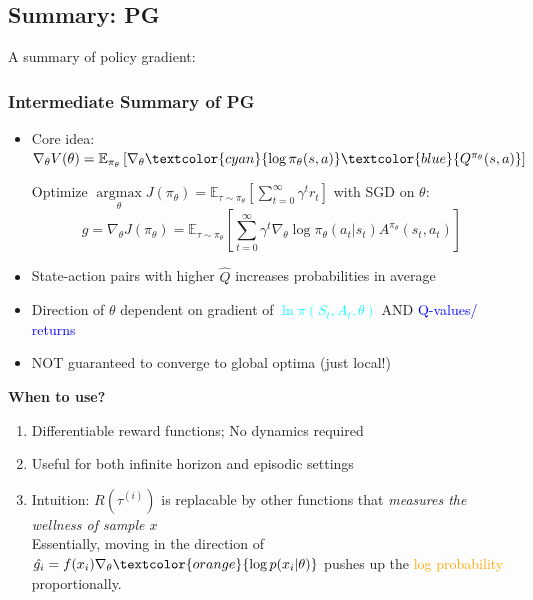 \documentclass{article}
\begin{document}
\subsection{Summary: PG}
A summary of policy gradient:
\begin{defbox}
    \subsubsection*{Intermediate Summary of PG}
    \begin{itemize}
    \item Core idea: $\nabla_{\theta} V(\theta) = \mathbb{E}_{\pi_{\theta}} \left[ \nabla_{\theta} \textcolor{cyan}{\log \pi_{\theta} (s, a)} \textcolor{blue}{Q^{\pi_{\theta}} (s, a)} \right]$
        \\\begin{prfbox}
            Optimize $\mathop{\arg\max}\limits_{\theta} J(\pi_{\theta}) = \mathbb{E}_{\tau \sim \pi_{\theta}} \left[ \sum_{t = 0}^{\infty} \gamma^{t} r_{t}\right]$ with SGD on $\theta$:
            \begin{equation*}
                g = \nabla_{\theta} J(\pi_{\theta}) = \mathbb{E}_{\tau \sim \pi_{\theta}} \left[ \sum_{t = 0}^{\infty} \gamma^{t} \nabla_{\theta} \log \pi_{\theta} (a_t | s_t) A^{\pi_{\theta}} (s_t, a_t) \right]
            \end{equation*}
        \end{prfbox}
    \item State-action pairs with higher $\hat{Q}$ increases probabilities in average
    \item Direction of $\theta$ dependent on gradient of \textcolor{cyan}{$\ln \pi(S_t, A_t, \theta)$} AND \textcolor{blue}{Q-values/ returns}
    \item NOT guaranteed to converge to global optima (just local!)
    \end{itemize}

    \textbf{When to use?}
    \begin{enumerate}
    \item Differentiable reward functions; No dynamics required
    \item Useful for both infinite horizon and episodic settings
    \item Intuition: $R(\tau^{(i)})$ is replacable by other functions that \textit{measures the wellness of sample $x$}
        \\Essentially, moving in the direction of $\hat{g_{i}} = f(x_i) \nabla_{\theta} \textcolor{orange}{\log p(x_i | \theta)}$ pushes up the \textcolor{orange}{log probability} proportionally.
    \end{enumerate}
\end{defbox}
\end{document}
